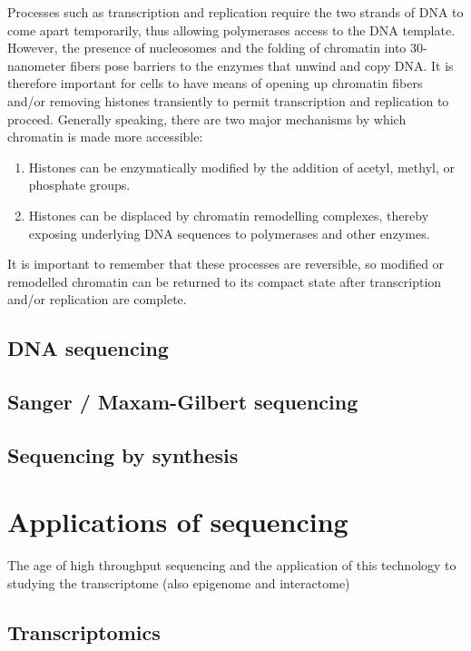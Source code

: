 Processes such as transcription and replication require the two strands of DNA to come apart temporarily, thus allowing polymerases access to the DNA template. However, the presence of nucleosomes and the folding of chromatin into 30-nanometer fibers pose barriers to the enzymes that unwind and copy DNA. It is therefore important for cells to have means of opening up chromatin fibers and/or removing histones transiently to permit transcription and replication to proceed. Generally speaking, there are two major mechanisms by which chromatin is made more accessible:

\begin{enumerate}
   \item Histones can be enzymatically modified by the addition of acetyl, methyl, or phosphate groups.
   \item Histones can be displaced by chromatin remodelling complexes, thereby exposing underlying DNA sequences to polymerases and other enzymes.
\end{enumerate}

It is important to remember that these processes are reversible, so modified or remodelled chromatin can be returned to its compact state after transcription and/or replication are complete.

\subsection{DNA sequencing}

\subsection{Sanger / Maxam-Gilbert sequencing}

\subsection{Sequencing by synthesis}

\section{Applications of sequencing}

The age of high throughput sequencing and the application of this technology to studying the transcriptome (also epigenome and interactome)

\subsection{Transcriptomics}

